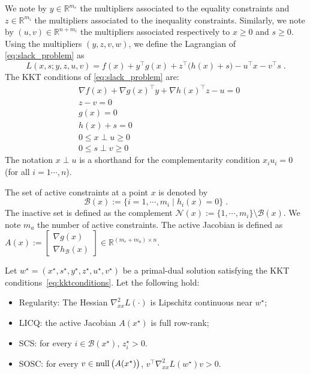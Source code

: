 We note by $y \in \mathbb{R}^{m_e}$ the multipliers associated
to the equality constraints and $z \in \mathbb{R}^{m_i}$ the multipliers
associated to the inequality constraints. Similarly, we note
by $(u, v) \in \mathbb{R}^{n + m_i}$ the multipliers associated
respectively to $x \geq 0$ and $s \geq 0$.
Using the multipliers $(y, z, v, w)$, we define the Lagrangian of \eqref{eq:slack_problem} as
\begin{equation}
  \label{eq:lagrangian}
  L(x, s; y, z, u, v) = f(x) + y^\top g(x) + z^\top \big(h(x) +s\big)
  - u^\top x - v^\top s \; .
\end{equation}
The KKT conditions of \eqref{eq:slack_problem} are:
\begin{subequations}
  \label{eq:kktconditions}
    \begin{align}
      & \nabla f(x) + \nabla g(x)^\top y + \nabla h(x)^\top z - u = 0 \\
      & z - v = 0 \\
      & g(x) = 0 \\
      & h(x) + s = 0 \\
      \label{eq:kktconditions:compx}
      & 0 \leq x \perp u \geq 0 \\
      \label{eq:kktconditions:comps}
      & 0 \leq s \perp v \geq 0
    \end{align}
\end{subequations}
The notation $x \perp u$ is a shorthand for the complementarity
condition $x_i u_i = 0$ (for all $i=1\cdots, n$).

The set of active constraints at a point $x$ is denoted by
\begin{equation}
  \mathcal{B}(x) := \{ i = 1, \cdots, m_i \; | \; h_i(x) = 0 \} \; .
\end{equation}
The inactive set is defined as the complement $\mathcal{N}(x) := \{1, \cdots, m_i \} \setminus \mathcal{B}(x)$.
We note $m_a$ the number of active constraints.
The active Jacobian is defined as $A(x) := \begin{bmatrix} \nabla g(x) \\ \nabla h_{\mathcal{B}}(x) \end{bmatrix} \in \mathbb{R}^{(m_e + m_a) \times n}$.

\begin{assumption}
  \label{hyp:ipm}
  Let $w^\star = (x^\star, s^\star, y^\star, z^\star, u^\star, v^\star)$ be a primal-dual solution
  satisfying the KKT conditions~\eqref{eq:kktconditions}. Let the following hold:
  \begin{itemize}
    \item Regularity: The Hessian $\nabla^2_{x x} L(\cdot)$ is Lipschitz continuous
      near $w^\star$;
    \item LICQ: the active Jacobian $A(x^\star)$ is full row-rank;
    \item SCS: for every $i \in \mathcal{B}(x^\star)$, $z_i^\star > 0$.
    \item SOSC: for every $v \in \operatorname{null}\big(A(x^\star)\big)$,
      $v^\top \nabla_{x x}^2 L(w^\star) v > 0$.
  \end{itemize}
\end{assumption}


